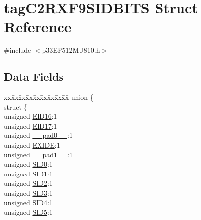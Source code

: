 \hypertarget{structtag_c2_r_x_f9_s_i_d_b_i_t_s}{}\section{tag\+C2\+R\+X\+F9\+S\+I\+D\+B\+I\+TS Struct Reference}
\label{structtag_c2_r_x_f9_s_i_d_b_i_t_s}


{\ttfamily \#include $<$p33\+E\+P512\+M\+U810.\+h$>$}

\subsection*{Data Fields}
\begin{DoxyCompactItemize}
\item 
\begin{tabbing}
xx\=xx\=xx\=xx\=xx\=xx\=xx\=xx\=xx\=\kill
union \{\\
\>struct \{\\
\>\>unsigned \hyperlink{structtag_c2_r_x_f9_s_i_d_b_i_t_s_a6dd5663b0c9838c56db040560ca0efa1}{EID16}:1\\
\>\>unsigned \hyperlink{structtag_c2_r_x_f9_s_i_d_b_i_t_s_aa648615464b0eb29967529333eee9fd9}{EID17}:1\\
\>\>unsigned \hyperlink{structtag_c2_r_x_f9_s_i_d_b_i_t_s_adf71f3d8410c1f1dbbc96680a92c49af}{\_\_pad0\_\_}:1\\
\>\>unsigned \hyperlink{structtag_c2_r_x_f9_s_i_d_b_i_t_s_a09ff1c1be3927220bd3dfbc10edfe243}{EXIDE}:1\\
\>\>unsigned \hyperlink{structtag_c2_r_x_f9_s_i_d_b_i_t_s_acaf2d0924a107ec6e8d2e31febaf66f9}{\_\_pad1\_\_}:1\\
\>\>unsigned \hyperlink{structtag_c2_r_x_f9_s_i_d_b_i_t_s_a1ca276ac15df60e1f7b9a6d0011ade93}{SID0}:1\\
\>\>unsigned \hyperlink{structtag_c2_r_x_f9_s_i_d_b_i_t_s_a3405d354f81391f879648f69f504dfc8}{SID1}:1\\
\>\>unsigned \hyperlink{structtag_c2_r_x_f9_s_i_d_b_i_t_s_ad744966dfc49307f731b7045b01b94e5}{SID2}:1\\
\>\>unsigned \hyperlink{structtag_c2_r_x_f9_s_i_d_b_i_t_s_a9345f3e64720be93e83d8dfc827f3f45}{SID3}:1\\
\>\>unsigned \hyperlink{structtag_c2_r_x_f9_s_i_d_b_i_t_s_aefb106fed4bb40e2c3c71ac612c554e3}{SID4}:1\\
\>\>unsigned \hyperlink{structtag_c2_r_x_f9_s_i_d_b_i_t_s_a0f221b3c9612231686bf87ccdcec8489}{SID5}:1\\

\end{tabbing}
\end{DoxyCompactItemize}
